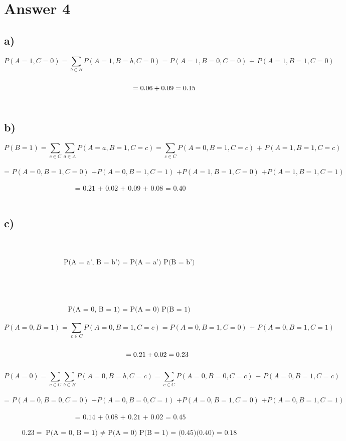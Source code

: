 \documentclass[11pt]{article}
\begin{document}
\section*{Answer 4}
\subsection*{a)}
\[P(A=1,C=0) = \sum_{b\in B} P(A=1,B=b,C=0) = P(A=1,B=0,C=0) \text{ + } P(A=1,B=1,C=0)\]\\
\[\hspace{3.4cm}= 0.06 + 0.09 = 0.15\]\\
\subsection*{b)}
\[P(B = 1) = \sum_{c\in C} \sum_{a\in A} P(A=a,B=1,C=c) = \sum_{c\in C} P(A=0,B=1,C=c) \text{ + }P(A=1,B=1,C=c)\]\\
\[\text{= }P(A=0,B=1,C=0)\text{ +}P(A=0,B=1,C=1)\text{ +} P(A=1,B=1,C=0)\text{ +}P(A=1,B=1,C=1)\]\\
\[\text{= } \text{0.21 + 0.02 + 0.09 + 0.08 = 0.40}\]\\
\subsection*{c)}
\\
\\
\[\text{P(A = a', B = b') = P(A = a') P(B = b') }\]\\
\\
\\
\\
\[\text{P(A = 0, B = 1) = P(A = 0) P(B = 1) }\]\\
\[P(A=0,B=1) = \sum_{c\in C} P(A=0,B=1,C=c) = P(A=0,B=1,C=0) \text{ + } P(A=0,B=1,C=1)\]\\
\[\hspace{2.7cm}= 0.21 + 0.02 = 0.23\]\\
\[P(A = 0) = \sum_{c\in C} \sum_{b\in B} P(A=0,B=b,C=c) = \sum_{c\in C} P(A=0,B=0,C=c) \text{ + }P(A=0,B=1,C=c)\]\\
\[\text{= }P(A=0,B=0,C=0)\text{ +}P(A=0,B=0,C=1)\text{ +} P(A=0,B=1,C=0)\text{ +}P(A=0,B=1,C=1)\]\\
\[\text{= } \text{0.14 + 0.08 + 0.21 + 0.02 = 0.45}\]\\
\[0.23 = \text{P(A = 0, B = 1) $\neq$ P(A = 0) P(B = 1) = (0.45)(0.40) = 0.18}\]\\
\\
\end{document}
